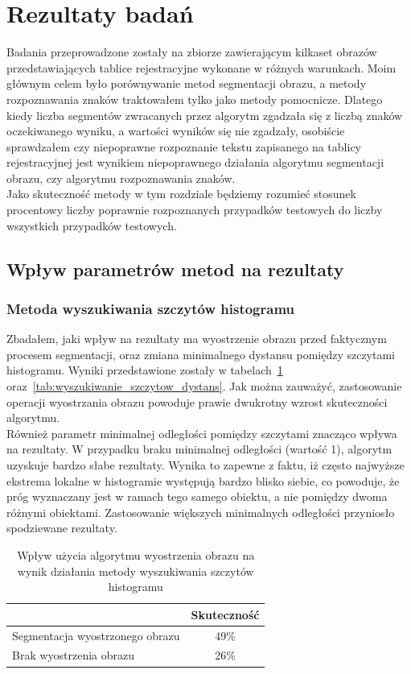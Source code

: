 \section{Rezultaty badań}
Badania przeprowadzone zostały na zbiorze zawierającym kilkaset obrazów przedstawiających tablice rejestracyjne wykonane w różnych warunkach. Moim głównym celem było porównywanie metod segmentacji obrazu, a metody rozpoznawania znaków traktowałem tylko jako metody pomocnicze. Dlatego kiedy liczba segmentów zwracanych przez algorytm zgadzała się z liczbą znaków oczekiwanego wyniku, a wartości wyników się nie zgadzały, osobiście sprawdzałem czy niepoprawne rozpoznanie tekstu zapisanego na tablicy rejestracyjnej jest wynikiem niepoprawnego działania algorytmu segmentacji obrazu, czy algorytmu rozpoznawania znaków. \\
Jako skuteczność metody w tym rozdziale będziemy rozumieć stosunek procentowy liczby poprawnie rozpoznanych przypadków testowych do liczby wszystkich przypadków testowych.

\subsection{Wpływ parametrów metod na rezultaty}
\subsubsection{Metoda wyszukiwania szczytów histogramu}
Zbadałem, jaki wpływ na rezultaty ma wyostrzenie obrazu przed faktycznym procesem segmentacji, oraz zmiana minimalnego dystansu pomiędzy szczytami histogramu. Wyniki przedstawione zostały w tabelach~\ref{tab:wyszukiwanie_szczytow_wyostrz} oraz~\ref{tab:wyszukiwanie_szczytow_dystans}. Jak można zauważyć, zastosowanie operacji wyostrzania obrazu powoduje prawie dwukrotny wzrost skuteczności algorytmu. \\
Również parametr minimalnej odległości pomiędzy szczytami znacząco wpływa na rezultaty. W przypadku braku minimalnej odległości (wartość 1), algorytm uzyskuje bardzo słabe rezultaty. Wynika to zapewne z faktu, iż często najwyższe ekstrema lokalne w histogramie występują bardzo blisko siebie, co powoduje, że próg wyznaczany jest w ramach tego samego obiektu, a nie pomiędzy dwoma różnymi obiektami. Zastosowanie większych minimalnych odległości przyniosło spodziewane rezultaty.


\begin {table}[H]
  \begin{center}
    \begin{tabular}{l | c}
      \space & Skuteczność \\
      \hline
      Segmentacja wyostrzonego obrazu & 49\% \\
      Brak wyostrzenia obrazu & 26\%
    \end{tabular}
    \caption {Wpływ użycia algorytmu wyostrzenia obrazu na wynik działania metody wyszukiwania szczytów histogramu}
    \label{tab:wyszukiwanie_szczytow_wyostrz} 
  \end{center}
\end {table}

